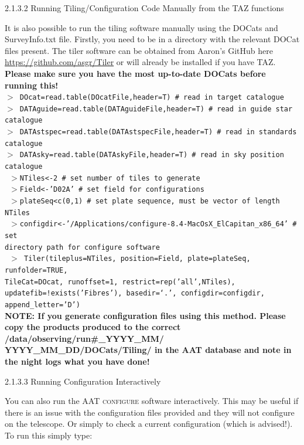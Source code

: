 \documentclass[12pt]{article}
\begin{document}
\textsf{2.1.3.2 Running Tiling/Configuration Code Manually from the TAZ functions}

It is also possible to run the tiling software manually using the DOCats and SurveyInfo.txt file. Firstly, you need to be in a directory with the relevant DOCat files present. The tiler software can be obtained from Aaron's GitHub here \url{https://github.com/asgr/Tiler} or will already be installed if you have TAZ. \textbf{\textcolor{PineGreen}{Please make sure you have the most up-to-date DOCats before running this!}}   \\

\texttt{$>$ DOcat=read.table(DOcatFile,header=T) \# read in target catalogue}\\
\texttt{$>$ DATAguide=read.table(DATAguideFile,header=T)  \# read in guide star catalogue}\\
\texttt{$>$ DATAstspec=read.table(DATAstspecFile,header=T) \# read in standards catalogue}\\
\texttt{$>$ DATAsky=read.table(DATAskyFile,header=T) \# read in sky position catalogue}\\

\texttt{ $>$NTiles<-2 \# set number of tiles to generate }\\
\texttt{ $>$Field<-'D02A'  \# set field for configurations}\\
\texttt{ $>$plateSeq<c(0,1) \# set plate sequence, must be vector of length NTiles}\\
\texttt{ $>$configdir<-'/Applications/configure-8.4-MacOsX\_ElCapitan\_x86\_64'  \# set \\ directory path for configure software}\\

\texttt{ $>$ Tiler(tileplus=NTiles, position=Field, plate=plateSeq, runfolder=TRUE, \\ TileCat=DOcat, runoffset=1, restrict=rep('all',NTiles), \\ updatefib=!exists('Fibres'), basedir=`.', configdir=configdir, \\ append\_letter='D') }\\

\textbf{NOTE: If you generate configuration files using this method. Please copy the products produced to the correct /data/observing/run\#\_YYYY\_MM/ YYYY\_MM\_DD/DOCats/Tiling/ in the AAT database and note in the night logs what you have done!}


\textsf{2.1.3.3 Running Configuration Interactively}

You can also run the AAT \textsc{configure} software interactively. This may be useful if there is an issue with the configuration files provided and they will not configure on the telescope.  Or simply to check a current configuration (which is advised!). To run this simply type:\\
\end{document}
